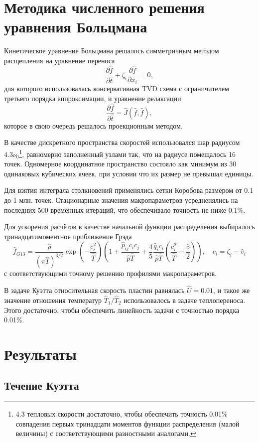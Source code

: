 \documentclass[a4paper,12pt]{article}
\begin{document}
\section{Методика численного решения уравнения Больцмана}

Кинетическое уравнение Больцмана решалось симметричным методом расщепления на уравнение переноса
\[ \frac{\partial\hat{f}}{\partial\hat{t}} + \zeta_i\frac{\partial\hat{f}}{\partial x_i} = 0, \]
для которого использовалась консервативная TVD схема с ограничителем третьего порядка аппроксимации,
и уравнение релаксации
\[ \frac{\partial\hat{f}}{\partial\hat{t}} = \hat{J}(\hat{f},\hat{f}), \]
которое в свою очередь решалось проекционным методом.

В качестве дискретного пространства скоростей использовался шар радиусом \(4.3\nu_0\)\footnote
{
    4.3 тепловых скорости достаточно, чтобы обеспечить точность 0.01\% совпадения
    первых тринадцати моментов функции распределения (малой величины) с соответствующими разностными аналогами.
},
равномерно заполненный узлами так, что на радиусе помещалось 16 точек.
Одномерное координатное пространство состояло как минимум из 30 одинаковых кубических ячеек,
при условии что их размер не превышал единицы.

Для взятия интеграла столкновений применялись сетки Коробова размером от 0.1 до 1 млн. точек.
Стационарные значения макропараметров усредненялись на последних 500 временных итераций,
что обеспечивало точность не ниже 0.1\%.

Для ускорения расчётов в качестве начальной функции распределения выбиралось тринадцатимоментное приближение Грэда
\[
    \hat{f}_{G13} = \frac{\hat\rho}{(\pi\hat T)^{3/2}}\exp\left(-\frac{c_i^2}{\hat T}\right)
    \left( 1+\frac{\hat p_{ij}c_ic_j}{\hat p\hat T} + \frac4{5}\frac{\hat q_ic_i}{\hat p\hat T}\left(\frac{c_i^2}{\hat T}-\frac5{2}\right) \right),
    \quad c_i = \zeta_i - \hat v_i
\]
с соответствующими точному решению профилями макропараметров.

В задаче Куэтта относительная скорость пластин равнялась \(\hat{U}=0.01\),
и такое же значение отношения температур \(\hat{T}_1/\hat{T}_2\) использовалось в задаче теплопереноса.
Этого достаточно, чтобы обеспечить линейность задачи с точностью порядка 0.01\%.

\section{Результаты}

\subsection{Течение Куэтта}
\end{document}

